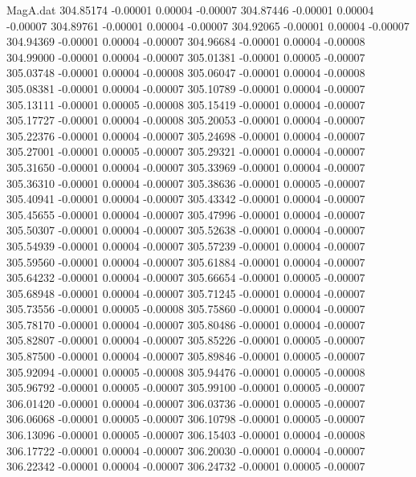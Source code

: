 \begin{filecontents}{MagA.dat}
 304.85174   -0.00001    0.00004   -0.00007
 304.87446   -0.00001    0.00004   -0.00007
 304.89761   -0.00001    0.00004   -0.00007
 304.92065   -0.00001    0.00004   -0.00007
 304.94369   -0.00001    0.00004   -0.00007
 304.96684   -0.00001    0.00004   -0.00008
 304.99000   -0.00001    0.00004   -0.00007
 305.01381   -0.00001    0.00005   -0.00007
 305.03748   -0.00001    0.00004   -0.00008
 305.06047   -0.00001    0.00004   -0.00008
 305.08381   -0.00001    0.00004   -0.00007
 305.10789   -0.00001    0.00004   -0.00007
 305.13111   -0.00001    0.00005   -0.00008
 305.15419   -0.00001    0.00004   -0.00007
 305.17727   -0.00001    0.00004   -0.00008
 305.20053   -0.00001    0.00004   -0.00007
 305.22376   -0.00001    0.00004   -0.00007
 305.24698   -0.00001    0.00004   -0.00007
 305.27001   -0.00001    0.00005   -0.00007
 305.29321   -0.00001    0.00004   -0.00007
 305.31650   -0.00001    0.00004   -0.00007
 305.33969   -0.00001    0.00004   -0.00007
 305.36310   -0.00001    0.00004   -0.00007
 305.38636   -0.00001    0.00005   -0.00007
 305.40941   -0.00001    0.00004   -0.00007
 305.43342   -0.00001    0.00004   -0.00007
 305.45655   -0.00001    0.00004   -0.00007
 305.47996   -0.00001    0.00004   -0.00007
 305.50307   -0.00001    0.00004   -0.00007
 305.52638   -0.00001    0.00004   -0.00007
 305.54939   -0.00001    0.00004   -0.00007
 305.57239   -0.00001    0.00004   -0.00007
 305.59560   -0.00001    0.00004   -0.00007
 305.61884   -0.00001    0.00004   -0.00007
 305.64232   -0.00001    0.00004   -0.00007
 305.66654   -0.00001    0.00005   -0.00007
 305.68948   -0.00001    0.00004   -0.00007
 305.71245   -0.00001    0.00004   -0.00007
 305.73556   -0.00001    0.00005   -0.00008
 305.75860   -0.00001    0.00004   -0.00007
 305.78170   -0.00001    0.00004   -0.00007
 305.80486   -0.00001    0.00004   -0.00007
 305.82807   -0.00001    0.00004   -0.00007
 305.85226   -0.00001    0.00005   -0.00007
 305.87500   -0.00001    0.00004   -0.00007
 305.89846   -0.00001    0.00005   -0.00007
 305.92094   -0.00001    0.00005   -0.00008
 305.94476   -0.00001    0.00005   -0.00008
 305.96792   -0.00001    0.00005   -0.00007
 305.99100   -0.00001    0.00005   -0.00007
 306.01420   -0.00001    0.00004   -0.00007
 306.03736   -0.00001    0.00005   -0.00007
 306.06068   -0.00001    0.00005   -0.00007
 306.10798   -0.00001    0.00005   -0.00007
 306.13096   -0.00001    0.00005   -0.00007
 306.15403   -0.00001    0.00004   -0.00008
 306.17722   -0.00001    0.00004   -0.00007
 306.20030   -0.00001    0.00004   -0.00007
 306.22342   -0.00001    0.00004   -0.00007
 306.24732   -0.00001    0.00005   -0.00007

\end{filecontents}
